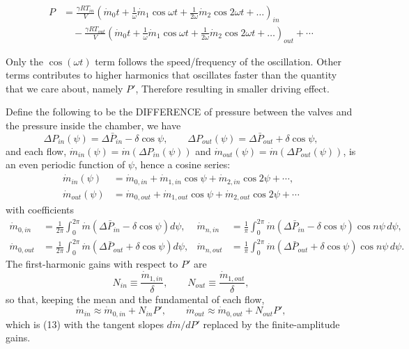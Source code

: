 \documentclass[11pt]{article}
\begin{document}
\begin{align*}
P &= \frac{\gamma R T_{in}}{V}\left(\dot m_0 t + \frac{1}{\omega} \dot m_1 \cos \omega t + \frac{1}{2\omega} \dot m_2 \cos 2 \omega t + \ldots\right)_{in} \\
&\quad - \frac{\gamma R T_{out}}{V} \left(\dot m_0 t + \frac{1}{\omega} \dot m_1 \cos \omega t + \frac{1}{2\omega} \dot m_2 \cos 2 \omega t + \ldots\right)_{out} + \cdots
\end{align*}

Only the $\cos(\omega t)$ term follows the speed/frequency of the oscillation. Other terms contributes to higher harmonics that oscillates faster than the quantity that we care about, namely $P'$, Therefore resulting in smaller driving effect.

Define the following to be the DIFFERENCE of pressure between the valves and the pressure inside the chamber, we have
\[
\Delta P_{in}(\psi) = \Delta\bar P_{in} - \delta\cos\psi, \qquad \Delta P_{out}(\psi) = \Delta\bar P_{out} + \delta\cos\psi,
\]
and each flow, $\dot m_{in}(\psi) = \dot m(\Delta P_{in}(\psi))$ and $\dot m_{out}(\psi) = \dot m(\Delta P_{out}(\psi))$, is an even periodic function of $\psi$, hence a cosine series:
\begin{align*}
\dot m_{in}(\psi) &= \dot m_{0,in} + \dot m_{1,in}\cos\psi + \dot m_{2,in}\cos 2\psi + \cdots, \\
\dot m_{out}(\psi) &= \dot m_{0,out} + \dot m_{1,out}\cos\psi + \dot m_{2,out}\cos 2\psi + \cdots
\end{align*}
with coefficients
\begin{equation}
\begin{aligned}
\dot m_{0,in} &= \frac{1}{2\pi}\int_0^{2\pi}\dot m\left(\Delta\bar P_{in} - \delta\cos\psi\right)d\psi, &
\dot m_{n,in} &= \frac{1}{\pi}\int_0^{2\pi}\dot m\left(\Delta\bar P_{in} - \delta\cos\psi\right)\cos n\psi\,d\psi, \\
\dot m_{0,out} &= \frac{1}{2\pi}\int_0^{2\pi}\dot m\left(\Delta\bar P_{out} + \delta\cos\psi\right)d\psi, &
\dot m_{n,out} &= \frac{1}{\pi}\int_0^{2\pi}\dot m\left(\Delta\bar P_{out} + \delta\cos\psi\right)\cos n\psi\,d\psi .
\end{aligned} \tag{16}
\end{equation}
The first-harmonic gains with respect to $P'$ are
\[
N_{in} \equiv \frac{\dot m_{1,in}}{\delta}, \qquad N_{out} \equiv \frac{\dot m_{1,out}}{\delta},
\]
so that, keeping the mean and the fundamental of each flow,
\[
\dot m_{in} \approx \dot m_{0,in} + N_{in}P', \qquad \dot m_{out} \approx \dot m_{0,out} + N_{out}P',
\]
which is (13) with the tangent slopes $d\dot m/dP'$ replaced by the finite-amplitude gains.
\end{document}
